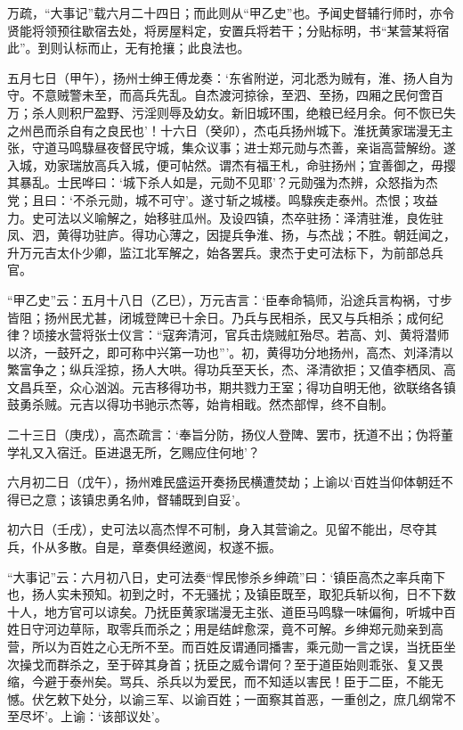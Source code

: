 \documentclass[]{article}
\begin{document}
万疏，``大事记''载六月二十四日；而此则从``甲乙史''也。予闻史督辅行师时，亦令贤能将领预往歇宿去处，将房屋料定，安置兵将若干；分贴标明，书``某营某将宿此''。到则认标而止，无有抢攘；此良法也。

五月七日（甲午），扬州士绅王傅龙奏：`东省附逆，河北悉为贼有，淮、扬人自为守。不意贼警未至，而高兵先乱。自杰渡河掠徐，至泗、至扬，四厢之民何啻百万；杀人则积尸盈野、污淫则辱及幼女。新旧城环围，绝粮已经月余。何不恢已失之州邑而杀自有之良民也'！十六日（癸卯），杰屯兵扬州城下。淮抚黄家瑞漫无主张，守道马鸣騄昼夜督民守城，集众议事；进士郑元勋与杰善，亲诣高营解纷。遂入城，劝家瑞放高兵入城，便可帖然。谓杰有福王札，命驻扬州；宜善御之，毋撄其暴乱。士民哗曰：`城下杀人如是，元勋不见耶'？元勋强为杰辨，众怒指为杰党；且曰：`不杀元勋，城不可守'。遂寸斩之城楼。鸣騄疾走泰州。杰恨；攻益力。史可法以义喻解之，始移驻瓜州。及设四镇，杰卒驻扬：泽清驻淮，良佐驻凤、泗，黄得功驻庐。得功心薄之，因提兵争淮、扬，与杰战；不胜。朝廷闻之，升万元吉太仆少卿，监江北军解之，始各罢兵。隶杰于史可法标下，为前部总兵官。

``甲乙史''云：五月十八日（乙巳），万元吉言：`臣奉命犒师，沿途兵言构祸，寸步皆阻；扬州民尤甚，闭城登陴已十余日。乃兵与民相杀，民又与兵相杀；成何纪律？顷接水营将张士仪言：``寇奔清河，官兵击烧贼舡殆尽。若高、刘、黄将潜师以济，一鼓歼之，即可称中兴第一功也'''。初，黄得功分地扬州，高杰、刘泽清以繁富争之；纵兵淫掠，扬人大哄。得功兵至天长，杰、泽清欲拒；又值李栖凤、高文昌兵至，众心汹汹。元吉移得功书，期共戮力王室；得功自明无他，欲联络各镇鼓勇杀贼。元吉以得功书驰示杰等，始肯相戢。然杰部悍，终不自制。

二十三日（庚戌），高杰疏言：`奉旨分防，扬仪人登陴、罢市，抚道不出；伪将董学礼又入宿迁。臣进退无所，乞赐应住何地'？

六月初二日（戊午），扬州难民盛运开奏扬民横遭焚劫；上谕以`百姓当仰体朝廷不得已之意；该镇忠勇名帅，督辅既到自妥'。

初六日（壬戌），史可法以高杰悍不可制，身入其营谕之。见留不能出，尽夺其兵，仆从多散。自是，章奏俱经邀阅，权遂不振。

``大事记''云：六月初八日，史可法奏``悍民惨杀乡绅疏''曰：`镇臣高杰之率兵南下也，扬人实未预知。初到之时，不无骚扰；及镇臣既至，取犯兵斩以徇，日不下数十人，地方官可以谅矣。乃抚臣黄家瑞漫无主张、道臣马鸣騄一味偏徇，听城中百姓日守河边草际，取零兵而杀之；用是结衅愈深，竟不可解。乡绅郑元勋亲到高营，所以为百姓之心无所不至。而百姓反谓通同播害，乘元勋一言之误，当抚臣坐次操戈而群杀之，至于碎其身首；抚臣之威令谓何？至于道臣始则乖张、复又畏缩，今避于泰州矣。骂兵、杀兵以为爱民，而不知适以害民！臣于二臣，不能无憾。伏乞敕下处分，以谕三军、以谕百姓；一面察其首恶，一重创之，庶几纲常不至尽坏'。上谕：`该部议处'。
\end{document}
